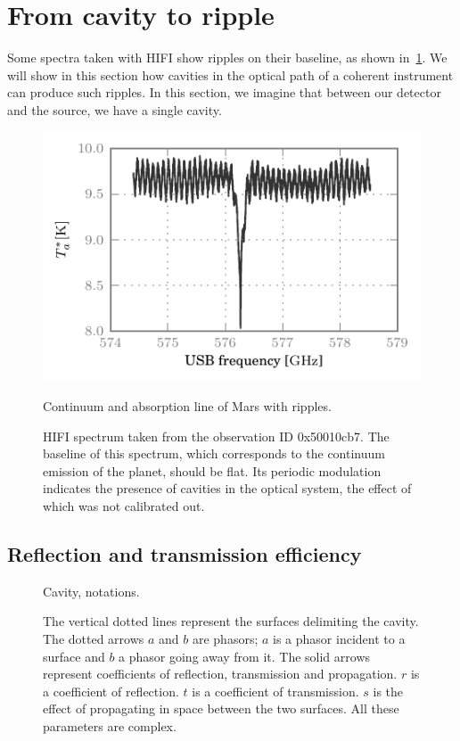 


\section{From cavity to ripple}
\label{sec:chapter2_2}

Some spectra taken with HIFI show ripples on their baseline, as shown in~\cref{fig:mars_50010cb7_WBSH_USB_chp2}.
We will show in this section how cavities in the optical path of a coherent instrument can produce such ripples.
In this section, we imagine that between our detector and the source, we have a single cavity.
\begin{figure}[htbp]
    \centering
    \includegraphics[width=.8\textwidth]{mars_50010cb7_WBSH_USB}
    \caption{Continuum and absorption line of Mars with ripples.}
    \caption*{
        HIFI spectrum taken from the observation ID 0x50010cb7.
        The baseline of this spectrum, which corresponds to the continuum emission of the planet, should be flat.
        Its periodic modulation indicates the presence of cavities in the optical system, the effect of which was not calibrated out.
    }
    \label{fig:mars_50010cb7_WBSH_USB_chp2}
\end{figure}


\subsection{Reflection and transmission efficiency}

\begin{figure}[hbtp]
    \centering
    
    \caption{Cavity, notations.}
    \caption*{
       The vertical dotted lines represent the surfaces delimiting the cavity.
       The dotted arrows $a$ and $b$ are phasors;
       $a$ is a phasor incident to a surface and
       $b$ a phasor going away from it.
       The solid arrows represent coefficients of reflection, transmission and propagation.
       $r$ is a coefficient of reflection.
       $t$ is a coefficient of transmission.
       $s$ is the effect of propagating in space between the two surfaces.
       All these parameters are complex.
    }
    \label{fig:cavity_notations}
\end{figure}

